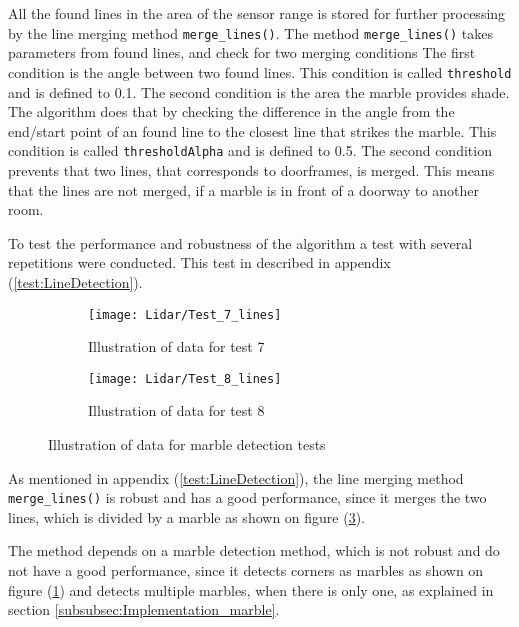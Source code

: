 \documentclass[../Head/Main.tex]{subfiles}
\begin{document}
All the found lines in the area of the sensor range is stored for further processing by the line merging method \texttt{merge\_lines()}.
The method \texttt{merge\_lines()} takes parameters from found lines, and check for two merging conditions The first condition is the angle between two found lines. This condition is called \texttt{threshold} and is defined to 0.1. The second condition is the area the marble provides shade. The algorithm does that by checking the difference in the angle from the end/start point of an found line to the closest line that strikes the marble. This condition is called \texttt{thresholdAlpha} and is defined to 0.5. The second condition prevents that two lines, that corresponds to doorframes, is merged. This means that the lines are not merged, if a marble is in front of a doorway to another room.\par
To test the performance and robustness of the algorithm a  test with several repetitions were conducted. This test in described in appendix (\ref{test:LineDetection}).
\begin{figure}[H]
  \begin{subfigure}[b]{0.5\textwidth}
  	\centering
    \texttt{[image: Lidar/Test\_7\_lines]}
    \caption{Illustration of data for test 7}
    \label{fig:LineTest7}
  \end{subfigure}
  \hfill
  \begin{subfigure}[b]{0.5\textwidth}
  	\centering
    \texttt{[image: Lidar/Test\_8\_lines]}
    \caption{Illustration of data for test 8}
    \label{fig:LineTest8}
  \end{subfigure}
  \caption{Illustration of data for marble detection tests}
\end{figure}
As mentioned in appendix (\ref{test:LineDetection}), the line merging method \texttt{merge\_lines()} is robust and has a good performance, since it merges the two lines, which is divided by a marble as shown on figure (\ref{fig:LineTest8}). \par
The method depends on a marble detection method, which is not robust and do not have a good performance, since it detects corners as marbles as shown on figure (\ref{fig:LineTest7}) and detects multiple marbles, when there is only one, as explained in section \ref{subsubsec:Implementation_marble}.
\end{document}
